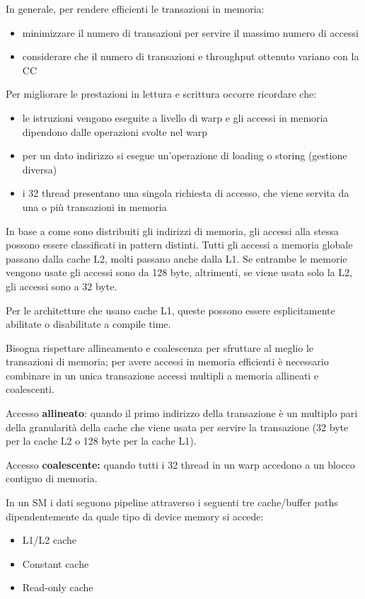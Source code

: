 In generale, per rendere efficienti le transazioni in memoria:
\begin{itemize}
	\item minimizzare il numero di transazioni per servire il massimo numero di accessi
    
	\item considerare che il numero di transazioni e throughput ottenuto variano con la CC
\end{itemize}

Per migliorare le prestazioni in lettura e scrittura occorre ricordare che: 
\begin{itemize}
	\item le istruzioni vengono eseguite a livello di warp e gli accessi in memoria dipendono dalle operazioni svolte nel warp
    
	\item per un dato indirizzo si esegue un'operazione di loading o storing (gestione diversa)
	
    \item i 32 thread presentano una singola richiesta di accesso, che viene servita da una o più transazioni in memoria
\end{itemize}

In base a come sono distribuiti gli indirizzi di memoria, gli accessi alla stessa possono essere classificati in pattern distinti. Tutti gli accessi a memoria globale passano dalla cache L2, molti passano anche dalla L1. Se entrambe le memorie vengono usate gli accessi sono da 128 byte, altrimenti, se viene usata solo la L2, gli accessi sono a 32 byte.

Per le architetture che usano cache L1, queste possono essere esplicitamente abilitate o disabilitate a compile time.

Bisogna rispettare allineamento e coalescenza per sfruttare al meglio le transazioni di memoria; per avere accessi in memoria efficienti è necessario combinare in un unica transazione accessi multipli a memoria allineati e coalescenti.

Accesso \textbf{allineato}: quando il primo indirizzo della transazione è un multiplo pari della granularità della cache che viene usata per servire la transazione (32 byte per la cache L2 o 128 byte per la cache L1).

Accesso \textbf{coalescente:} quando tutti i 32 thread in un warp accedono a un blocco contiguo di memoria.

In un SM i dati seguono pipeline attraverso i seguenti tre cache/buffer paths dipendentemente da quale tipo di device memory si accede:
\begin{itemize}
	\item L1/L2 cache
    
	\item Constant cache
	
    \item Read-only cache
\end{itemize}

